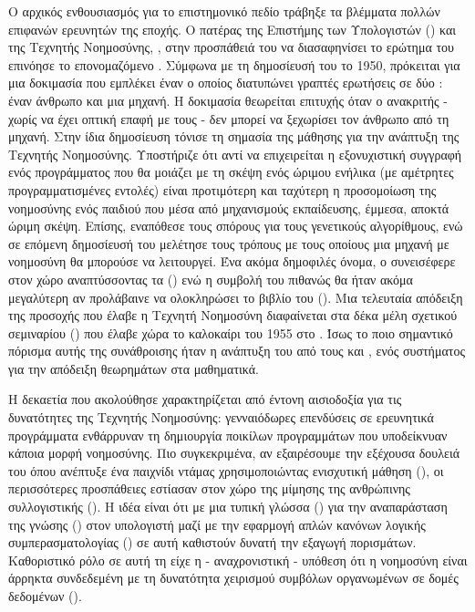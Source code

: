 Ο αρχικός ενθουσιασμός για το επιστημονικό πεδίο τράβηξε τα βλέμματα πολλών επιφανών ερευνητών της εποχής. Ο πατέρας της Επιστήμης των Υπολογιστών () και της Τεχνητής Νοημοσύνης, , στην προσπάθειά του να διασαφηνίσει το ερώτημα του  επινόησε το επονομαζόμενο . Σύμφωνα με τη δημοσίευσή του \cite{TURING/10.1093/mind/LIX.236.433} το 1950, πρόκειται για μια δοκιμασία που εμπλέκει έναν  ο οποίος διατυπώνει γραπτές ερωτήσεις σε δύο : έναν άνθρωπο και μια μηχανή. Η δοκιμασία θεωρείται επιτυχής όταν ο ανακριτής - χωρίς να έχει οπτική επαφή με τους  - δεν μπορεί να ξεχωρίσει τον άνθρωπο από τη μηχανή. Στην ίδια δημοσίευση τόνισε τη σημασία της μάθησης για την ανάπτυξη της Τεχνητής Νοημοσύνης. Υποστήριζε ότι αντί να επιχειρείται η εξονυχιστική συγγραφή ενός προγράμματος που θα μοιάζει με τη σκέψη ενός ώριμου ενήλικα (με αμέτρητες προγραμματισμένες εντολές) είναι προτιμότερη και ταχύτερη η προσομοίωση της νοημοσύνης ενός παιδιού που μέσα από μηχανισμούς εκπαίδευσης, έμμεσα, αποκτά ώριμη σκέψη. Επίσης, εναπόθεσε τους σπόρους για τους γενετικούς αλγορίθμους, ενώ σε επόμενη δημοσίευσή του \cite{turing1948intelligent} μελέτησε τους τρόπους με τους οποίους μια μηχανή με νοημοσύνη θα μπορούσε να λειτουργεί. Ένα ακόμα δημοφιλές όνομα, ο  συνεισέφερε στον χώρο αναπτύσσοντας τα  () \cite{muehlenbein2014artificial} ενώ η συμβολή του πιθανώς θα ήταν ακόμα μεγαλύτερη αν προλάβαινε να ολοκληρώσει το βιβλίο του  (). Μια τελευταία απόδειξη της προσοχής που έλαβε η Τεχνητή Νοημοσύνη διαφαίνεται στα δέκα μέλη σχετικού σεμιναρίου () που έλαβε χώρα το καλοκαίρι του 1955 στο \cite{russell2020artificial}. Ίσως το ποιο σημαντικό πόρισμα αυτής της συνάθροισης ήταν η ανάπτυξη του  από τους  και , ενός συστήματος για την απόδειξη θεωρημάτων στα μαθηματικά.
\par

Η δεκαετία που ακολούθησε χαρακτηρίζεται από έντονη αισιοδοξία για τις δυνατότητες της Τεχνητής Νοημοσύνης: γενναιόδωρες επενδύσεις σε ερευνητικά προγράμματα ενθάρρυναν τη δημιουργία ποικίλων προγραμμάτων που υποδείκνυαν κάποια μορφή νοημοσύνης. Πιο συγκεκριμένα, αν εξαιρέσουμε την εξέχουσα δουλειά του  όπου ανέπτυξε ένα παιχνίδι ντάμας χρησιμοποιώντας ενισχυτική μάθηση (), οι περισσότερες προσπάθειες εστίασαν στον χώρο της μίμησης της ανθρώπινης συλλογιστικής (). Η ιδέα είναι ότι με μια τυπική γλώσσα () για την αναπαράσταση της γνώσης () στον υπολογιστή μαζί με την εφαρμογή απλών κανόνων λογικής συμπερασματολογίας () σε αυτή καθιστούν δυνατή την εξαγωγή πορισμάτων. Καθοριστικό ρόλο σε αυτή τη  είχε η - αναχρονιστική - υπόθεση ότι η νοημοσύνη είναι άρρηκτα συνδεδεμένη με τη δυνατότητα χειρισμού συμβόλων οργανωμένων σε δομές δεδομένων (). 
\par

